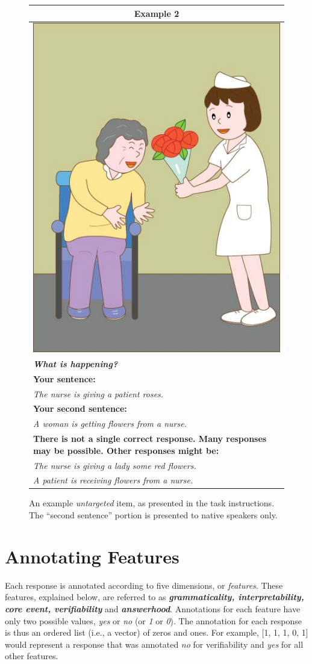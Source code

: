 \documentclass[12pt,notitlepage]{article}
\begin{document}
\begin{figure}[!htb]
\begin{center}
\begin{tabular}{|p{}|}
\hline
\multicolumn{1}{|c|}{\textbf{Example 2}}\\
\hline
\multicolumn{1}{|c|}{\includegraphics[width=0.4\columnwidth,trim=0 0 0 -3]{figures/ex01.jpg}}\\
\hline
\textbf{\textit{What is happening?}}\\
\hline
\textbf{Your sentence:} \\
\textit{The nurse is giving a patient roses.}\\
\hline
\textbf{Your second sentence:} \\
\textit{A woman is getting flowers from a nurse.} \\
\hline
\textbf{There is not a single correct response. Many responses may be possible. Other responses might be:} \\
\textit{The nurse is giving a lady some red flowers.} \\
\textit{A patient is receiving flowers from a nurse.} \\
\hline
\end{tabular}
\end{center}
\caption{An example \textit{untargeted} item, as presented in the task instructions. The ``second sentence'' portion is presented to native speakers only.}
\label{fig:instructions2}
\end{figure}

\clearpage
\section{Annotating Features}

Each response is annotated according to five dimensions, or \textit{features}. These features, explained below, are referred to as \textit{\textbf{grammaticality, interpretability, core event, verifiability}} and \textit{\textbf{answerhood}}. Annotations for each feature have only two possible values, \textit{yes} or \textit{no} (or \textit{1} or \textit{0}). The annotation for each response is thus an ordered list (i.e., a vector) of zeros and ones. For example, [1, 1, 1, 0, 1] would represent a response that was annotated \textit{no} for verifiability and \textit{yes} for all other features.
\end{document}
